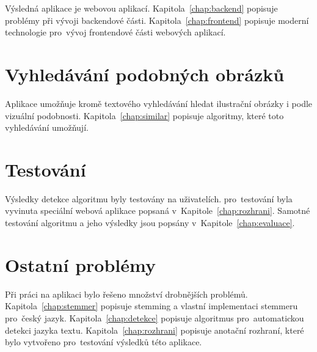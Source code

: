 Výsledná aplikace je webovou aplikací. Kapitola~\ref{chap:backend} popisuje problémy při vývoji backendové části. Kapitola~\ref{chap:frontend} popisuje moderní technologie pro~vývoj frontendové části webových aplikací.


\section{Vyhledávání podobných obrázků}

Aplikace umožňuje kromě textového vyhledávání hledat ilustrační obrázky i podle vizuální podobnosti. Kapitola~\ref{chap:similar} popisuje algoritmy, které toto vyhledávání umožňují.

\section{Testování}

Výsledky detekce algoritmu byly testovány na uživatelích. pro~testování byla vyvinuta speciální webová aplikace popsaná v~Kapitole~\ref{chap:rozhrani}. Samotné testování algoritmu a jeho výsledky jsou popsány v~Kapitole~\ref{chap:evaluace}.


\section{Ostatní problémy}

Při práci na aplikaci bylo řešeno množství drobnějších problémů. Kapitola~\ref{chap:stemmer} popisuje stemming a vlastní implementaci stemmeru pro~český jazyk. Kapitola~\ref{chap:detekce} popisuje algoritmus pro~automatickou detekci jazyka textu. Kapitola~\ref{chap:rozhrani} popisuje anotační rozhraní, které bylo vytvořeno pro~testování výsledků této aplikace.



